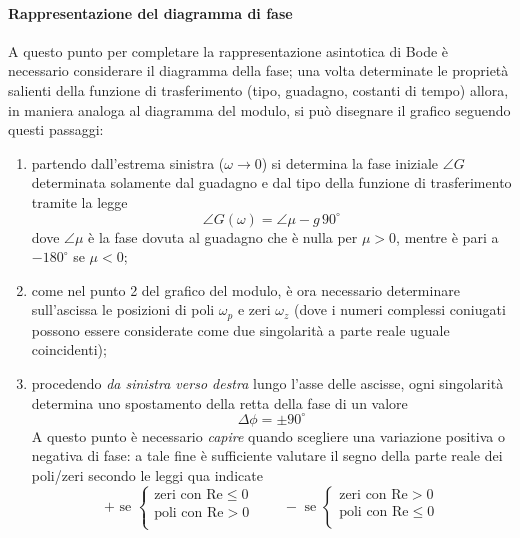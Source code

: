		\paragraph{Rappresentazione del diagramma di fase} A questo punto per completare la rappresentazione asintotica di Bode è necessario considerare il diagramma della fase; una volta determinate le proprietà salienti della funzione di trasferimento (tipo, guadagno, costanti di tempo) allora, in maniera analoga al diagramma del modulo, si può disegnare il grafico seguendo questi passaggi:
		\begin{enumerate}
			\item partendo dall'estrema sinistra ($\omega\rightarrow 0$) si determina la fase iniziale $\angle G$ determinata solamente dal guadagno e dal tipo della funzione di trasferimento tramite la legge
			\[ \angle G(\omega) = \angle \mu - g\,90^\circ \]
			dove $\angle \mu$ è la fase dovuta al guadagno che è nulla per $\mu >0$, mentre è pari a $-180^\circ$ se $\mu < 0$;
			
			\item come nel punto 2 del grafico del modulo, è ora necessario determinare sull'ascissa le posizioni di poli $\omega_p$ e zeri $\omega_z$ (dove i numeri complessi coniugati possono essere considerate come due singolarità a parte reale uguale coincidenti);
			\item procedendo \textit{da sinistra verso destra} lungo l'asse delle ascisse, ogni singolarità determina uno spostamento della retta della fase di un valore
			\[ \Delta \phi = \pm 90^\circ \]
			A questo punto è necessario \textit{capire} quando scegliere una variazione positiva o negativa di fase: a tale fine è sufficiente valutare il segno della parte reale dei poli/zeri secondo le leggi qua indicate
			\[ + \textrm{ se } \begin{cases}
				\textrm{zeri con Re}\leq 0 \\
				\textrm{poli con Re}> 0 \\
			\end{cases} \qquad - \textrm{ se } \begin{cases}
			\textrm{zeri con Re}> 0 \\
			\textrm{poli con Re}\leq 0 \\
			\end{cases} \]
			
		\end{enumerate}
			
			
			
			
			
			
	
		
		
	